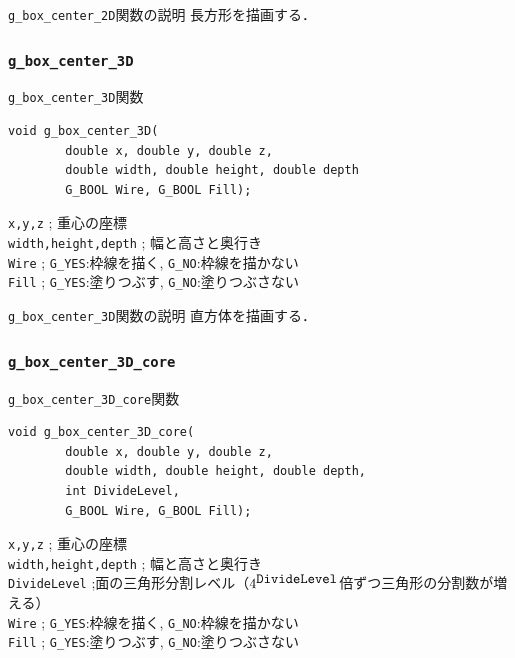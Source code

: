 \documentclass[platex,a4paper,12pt]{jsarticle}%
\begin{document}
\begin{itembox}[l]{\texttt{g\_box\_center\_2D}関数の説明}
長方形を描画する．
\end{itembox}


\subsubsection{\texttt{g\_box\_center\_3D}}

\begin{itembox}[l]{\texttt{g\_box\_center\_3D}関数}
\begin{verbatim}
void g_box_center_3D(
        double x, double y, double z,
        double width, double height, double depth
        G_BOOL Wire, G_BOOL Fill);   
\end{verbatim}
\verb|x,y,z| ; 重心の座標\\
\verb|width,height,depth| ; 幅と高さと奥行き\\
\verb|Wire| ; \verb|G_YES|:枠線を描く, \verb|G_NO|:枠線を描かない \\
\verb|Fill| ; \verb|G_YES|:塗りつぶす, \verb|G_NO|:塗りつぶさない
\end{itembox}

\begin{itembox}[l]{\texttt{g\_box\_center\_3D}関数の説明}
直方体を描画する．
\end{itembox}

\subsubsection{\texttt{g\_box\_center\_3D\_core}}

\begin{itembox}[l]{\texttt{g\_box\_center\_3D\_core}関数}
\begin{verbatim}
void g_box_center_3D_core(
        double x, double y, double z,
        double width, double height, double depth,
        int DivideLevel,
        G_BOOL Wire, G_BOOL Fill);   
\end{verbatim}
\verb|x,y,z| ; 重心の座標\\
\verb|width,height,depth| ; 幅と高さと奥行き\\
\verb|DivideLevel| ;面の三角形分割レベル（$4^{\verb|DivideLevel|}$倍ずつ三角形の分割数が増える）\\
\verb|Wire| ; \verb|G_YES|:枠線を描く, \verb|G_NO|:枠線を描かない \\
\verb|Fill| ; \verb|G_YES|:塗りつぶす, \verb|G_NO|:塗りつぶさない
\end{itembox}
\end{document}
